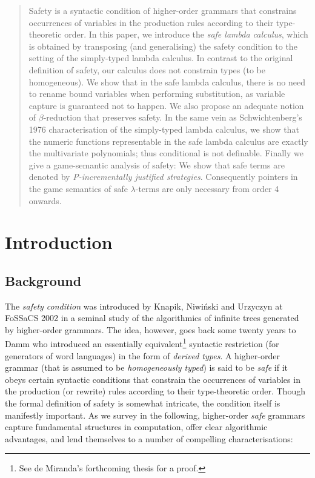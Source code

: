 \documentclass{llncs}
\begin{document}
\begin{abstract}
  Safety is a syntactic condition of higher-order grammars that
  constrains occurrences of variables in the production rules
  according to their type-theoretic order. In this paper, we introduce
  the \emph{safe lambda calculus}, which is obtained by transposing
  (and generalising) the safety condition to the setting of the
  simply-typed lambda calculus. In contrast to the original definition
  of safety, our calculus does not constrain types (to be
  homogeneous). We show that in the safe lambda calculus, there is no
  need to rename bound variables when performing substitution, as
  variable capture is guaranteed not to happen.  We also propose an
  adequate notion of $\beta$-reduction that preserves safety.  In the
  same vein as Schwichtenberg's 1976 characterisation of the
  simply-typed lambda calculus, we show that the numeric functions
  representable in the safe lambda calculus are exactly the
  multivariate polynomials; thus conditional is not definable.
  Finally we give a game-semantic analysis of safety: We show that
  safe terms are denoted by \emph{P-incrementally justified
    strategies}. Consequently pointers in the game semantics of safe
  $\lambda$-terms are only necessary from order 4 onwards.
\end{abstract}

\section{Introduction}

\subsection*{Background}

The \emph{safety condition} was introduced by Knapik, Niwi{\'n}ski and
Urzyczyn at FoSSaCS 2002 \cite{KNU02} in a seminal study of the
algorithmics of infinite trees generated by higher-order grammars. The
idea, however, goes back some twenty years to Damm \cite{Dam82} who
introduced an essentially equivalent\footnote{See de Miranda's
  forthcoming thesis \cite{demirandathesis} for a proof.} syntactic
restriction (for generators of word languages) in the form of
\emph{derived types}.
A higher-order grammar (that is assumed to be \emph{homogeneously
  typed}) is said to be \emph{safe} if it obeys certain syntactic
conditions that constrain the occurrences of variables in the
production (or rewrite) rules according to their type-theoretic
order. Though the formal definition of safety is somewhat intricate,
the condition itself is manifestly important. As we survey in the
following, higher-order \emph{safe} grammars capture fundamental
structures in computation, offer clear algorithmic advantages, and
lend themselves to a number of compelling characterisations:
\end{document}

